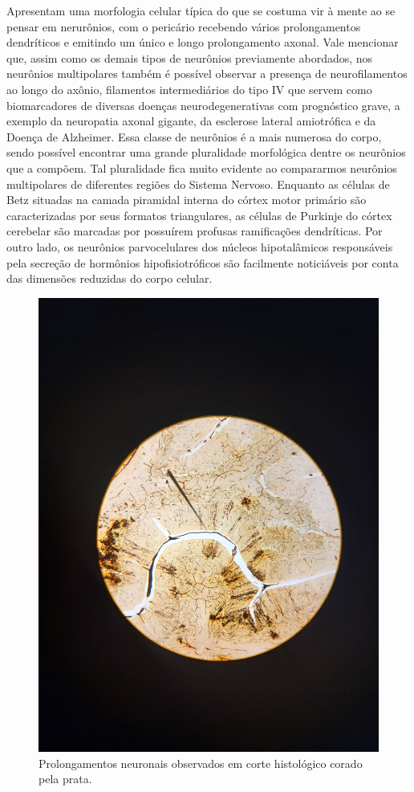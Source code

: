 \documentclass[
]{book}
\begin{document}
Apresentam uma morfologia celular típica do que se costuma vir à mente ao se pensar em nerurônios, com o pericário recebendo vários prolongamentos dendríticos e emitindo um único e longo prolongamento axonal. Vale mencionar que, assim como os demais tipos de neurônios previamente abordados, nos neurônios multipolares também é possível observar a presença de neurofilamentos ao longo do axônio, filamentos intermediários do tipo IV que servem como biomarcadores de diversas doenças neurodegenerativas com prognóstico grave, a exemplo da neuropatia axonal gigante, da esclerose lateral amiotrófica e da Doença de Alzheimer. Essa classe de neurônios é a mais numerosa do corpo, sendo possível encontrar uma grande pluralidade morfológica dentre os neurônios que a compõem. Tal pluralidade fica muito evidente ao compararmos neurônios multipolares de diferentes regiões do Sistema Nervoso. Enquanto as células de Betz situadas na camada piramidal interna do córtex motor primário são caracterizadas por seus formatos triangulares, as células de Purkinje do córtex cerebelar são marcadas por possuírem profusas ramificações dendríticas. Por outro lado, os neurônios parvocelulares dos núcleos hipotalâmicos responsáveis pela secreção de hormônios hipofisiotróficos são facilmente noticiáveis por conta das dimensões reduzidas do corpo celular.

\begin{figure}
\centering
\includegraphics{images/neuro-prata.jpeg}
\caption{\label{fig:unnamed-chunk-1}Prolongamentos neuronais observados em corte histológico corado pela prata.}
\end{figure}
\end{document}
